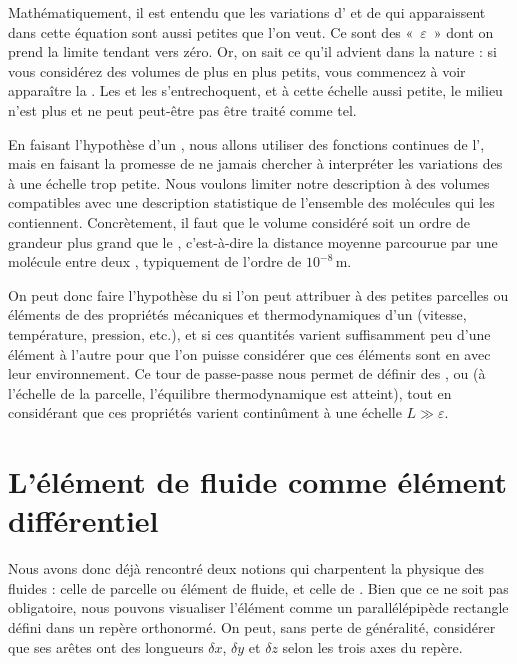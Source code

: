 Mathématiquement, il est entendu que les variations d’ et de  qui apparaissent dans cette équation sont aussi petites que l’on veut. Ce sont des «~$\varepsilon$~» dont on prend la limite tendant vers zéro. Or, on sait ce qu’il advient dans la nature : si vous considérez des volumes de plus en plus petits, vous commencez à voir apparaître la . Les  et les  s’entrechoquent, et à cette échelle aussi petite, le milieu n’est plus  et ne peut peut-être pas être traité comme tel.

En faisant l’hypothèse d’un , nous allons utiliser des fonctions continues de l’, mais en faisant la promesse de ne jamais chercher à interpréter les variations des  à une échelle trop petite. Nous voulons limiter notre description à des volumes compatibles avec une description statistique de l’ensemble des molécules qui les contiennent. Concrètement, il faut que le volume considéré soit un ordre de grandeur plus grand que le , c’est-à-dire la distance moyenne parcourue par une molécule entre deux , typiquement de l’ordre de $10^{-8}\,\mathrm{m}$.

On peut donc faire l’hypothèse du  si l’on peut attribuer à des petites parcelles ou éléments de  des propriétés mécaniques et thermodynamiques d’un  (vitesse, température, pression, etc.), et si ces quantités varient suffisamment peu d’une élément à l’autre pour que l’on puisse considérer que ces éléments sont en  avec leur environnement. Ce tour de passe-passe nous permet de définir des ,  ou  (à l’échelle de la parcelle, l’équilibre thermodynamique est atteint), tout en considérant que ces propriétés varient continûment à une échelle $L \gg \varepsilon$.

\section{L'élément de fluide comme élément différentiel}

Nous avons donc déjà rencontré deux notions qui charpentent la physique des fluides : celle de parcelle ou élément de fluide, et celle de .
Bien que ce ne soit pas obligatoire, nous pouvons visualiser l'élément comme un parallélépipède rectangle défini dans un repère orthonormé. On peut, sans perte de généralité, considérer que ses arêtes ont des longueurs $\delta x$, $\delta y$ et $\delta z$ selon les trois axes du repère.


